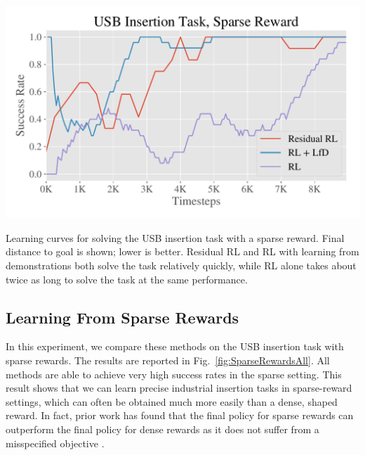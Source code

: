 \begin{table}[ht!]
\begin{minipage}[t]{.47\textwidth}
    \label{tab:goal_pertubation_USB}
    \label{fig:TableUSB}
\end{minipage}
\hfill
\begin{minipage}[t]{.49\textwidth}
\centering
    \includegraphics[width=1\linewidth]{insertion/newfigs/Sparse_success_all.pdf}
    \captionsetup{justification=justified,format=plain}
    \label{fig:SparseRewardsAll}
\end{minipage}
\caption{Learning curves for solving the USB insertion task with a sparse reward. Final distance to goal is shown; lower is better. Residual RL and RL with learning from demonstrations both solve the task relatively quickly, while RL alone takes about twice as long to solve the task at the same performance. }
\end{table}

\subsection{Learning From Sparse Rewards}

In this experiment, we compare these methods on the USB insertion task with sparse rewards. The results are reported in Fig.~\ref{fig:SparseRewardsAll}. All methods are able to achieve very high success rates in the sparse setting. 
This result shows that we can learn precise industrial insertion tasks in sparse-reward settings, which can often be obtained much more easily than a dense, shaped reward. 
In fact, prior work has found that the final policy for sparse rewards can outperform the final policy for dense rewards as it does not suffer from a misspecified objective \citep{andrychowicz2017her}.

